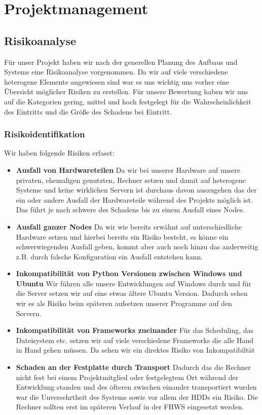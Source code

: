 \documentclass[12pt,oneside,a4paper,parskip]{scrbook}
\begin{document}
\chapter{Projektmanagement}
\section{Risikoanalyse}
Für unser Projekt haben wir nach der generellen Planung des Aufbaus und Systems eine Risikoanalyse vorgenommen. Da wir auf viele verschiedene heterogene Elemente angewiesen sind war es uns wichtig uns vorher eine Übersicht möglicher Risiken zu erstellen. Für unsere Bewertung haben wir uns auf die Kategorien {gering, mittel und hoch} festgelegt für die Wahrscheinlichkeit des Eintritts und die Größe des Schadens bei Eintritt.
\subsection{Risikoidentifikation}
Wir haben folgende Risiken erfasst:

\begin{itemize}
\item\textbf{Ausfall von Hardwareteilen}
Da wir bei unserer Hardware auf unsere privaten, ehemaligen genutzten, Rechner setzen und damit auf heterogene Systeme und keine wirklichen Servern ist durchaus davon auszugehen das der ein oder andere Ausfall der Hardwareteile während des Projekts möglich ist. Das führt je nach schwere des Schadens bis zu einem Ausfall eines Nodes.
\item\textbf{Ausfall ganzer Nodes}
Da wir wie bereits erwähnt auf unterschiedliche Hardware setzen und hierbei bereits ein Risiko besteht, es könne ein schwerwiegenden Ausfall geben, kommt aber auch noch hinzu das anderweitig z.B. durch falsche Konfiguration ein Ausfall entstehen kann.
\item\textbf{Inkompatibilität von Python Versionen zwischen Windows und Ubuntu}
Wir führen alle unsere Entwicklungen auf Windows durch und für die Server setzen wir auf eine etwas ältere Ubuntu Version. Dadurch sehen wir es als Risiko beim späteren aufsetzen unserer Programme auf den Servern.
\item\textbf{Inkompatibilität von Frameworks zueinander}
Für das Scheduling, das Dateisystem etc. setzen wir auf viele verschiedene Frameworks die alle Hand in Hand gehen müssen. Da sehen wir ein direktes Risiko von Inkompatibiltät
\item\textbf{Schaden an der Festplatte durch Transport}
Dadurch das die Rechner nicht fest bei einem Projektmitglied oder festgelegtem Ort während der Entwicklung standen und des öfteren zwischen einander
transportiert wurden war die Unversehrtheit des Systems sowie vor allem der HDDs ein Risiko. Die Rechner sollten erst im späteren Verlauf in der FHWS eingesetzt werden.
\end{itemize}
\end{document}

